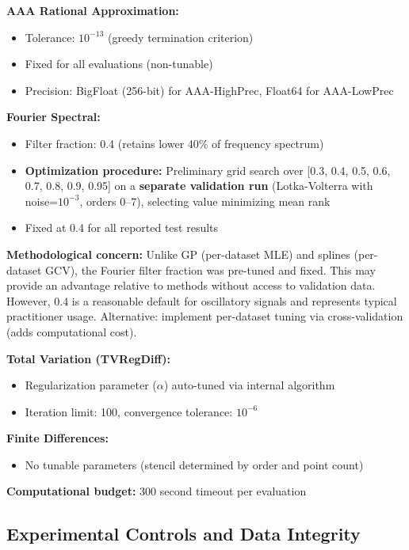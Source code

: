 \textbf{AAA Rational Approximation:}
\begin{itemize}
    \item Tolerance: $10^{-13}$ (greedy termination criterion)
    \item Fixed for all evaluations (non-tunable)
    \item Precision: BigFloat (256-bit) for AAA-HighPrec, Float64 for AAA-LowPrec
\end{itemize}

\textbf{Fourier Spectral:}
\begin{itemize}
    \item Filter fraction: 0.4 (retains lower 40\% of frequency spectrum)
    \item \textbf{Optimization procedure:} Preliminary grid search over [0.3, 0.4, 0.5, 0.6, 0.7, 0.8, 0.9, 0.95] on a \textbf{separate validation run} (Lotka-Volterra with noise=$10^{-3}$, orders 0--7), selecting value minimizing mean rank
    \item Fixed at 0.4 for all reported test results
\end{itemize}

\textbf{Methodological concern:} Unlike GP (per-dataset MLE) and splines (per-dataset GCV), the Fourier filter fraction was pre-tuned and fixed. This may provide an advantage relative to methods without access to validation data. However, 0.4 is a reasonable default for oscillatory signals and represents typical practitioner usage. Alternative: implement per-dataset tuning via cross-validation (adds computational cost).

\textbf{Total Variation (TVRegDiff):}
\begin{itemize}
    \item Regularization parameter ($\alpha$) auto-tuned via internal algorithm
    \item Iteration limit: 100, convergence tolerance: $10^{-6}$
\end{itemize}

\textbf{Finite Differences:}
\begin{itemize}
    \item No tunable parameters (stencil determined by order and point count)
\end{itemize}

\textbf{Computational budget:} 300 second timeout per evaluation

\subsection{Experimental Controls and Data Integrity}
\label{sec:controls}

